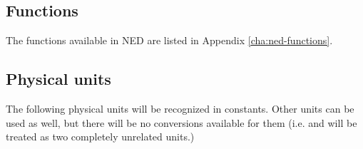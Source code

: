 \subsection{Functions}

The functions available in NED are listed in Appendix
\ref{cha:ned-functions}.

\subsection{Physical units}
\label{ch-ned-ref:sec:units}

The following physical units will be recognized in constants. Other units can
be used as well, but there will be no conversions available for them (i.e.
 and  will be treated as two completely unrelated
units.)

